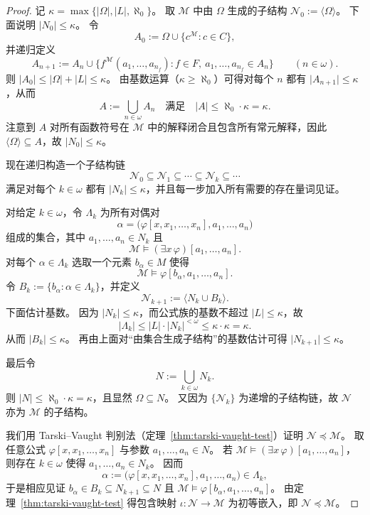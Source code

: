 \documentclass[lang=cn,a4paper,newtx,section]{elegantbook}
\begin{document}
 \begin{proof}
 记 $\kappa=\max\{\lvert\Omega\rvert,\lvert L\rvert,\aleph_0\}$。
 取 $\mathcal M$ 中由 $\Omega$ 生成的子结构 $\mathcal N_0:=\langle\Omega\rangle$。
 下面说明 $\lvert N_0\rvert\le\kappa$。
 令
 \[
   A_0:=\Omega\cup\{c^{\mathcal M}:c\in C\},
 \]
 并递归定义
 \[
   A_{n+1}:=A_n\cup\{f^{\mathcal M}(a_1,\dots,a_{n_f}):f\in F,\ a_1,\dots,a_{n_f}\in A_n\}\qquad(n\in\omega).
 \]
 则 $\lvert A_0\rvert\le\lvert\Omega\rvert+\lvert L\rvert\le\kappa$。
 由基数运算（$\kappa\ge\aleph_0$）可得对每个 $n$ 都有 $\lvert A_{n+1}\rvert\le\kappa$，从而
 \[
   A:=\bigcup_{n\in\omega}A_n\quad\text{满足}\quad \lvert A\rvert\le\aleph_0\cdot\kappa=\kappa.
 \]
 注意到 $A$ 对所有函数符号在 $\mathcal M$ 中的解释闭合且包含所有常元解释，因此 $\langle\Omega\rangle\subseteq A$，故 $\lvert N_0\rvert\le\kappa$。

 现在递归构造一个子结构链
 \[
   \mathcal N_0\subseteq\mathcal N_1\subseteq\cdots\subseteq\mathcal N_k\subseteq\cdots
 \]
 满足对每个 $k\in\omega$ 都有 $\lvert N_k\rvert\le\kappa$，并且每一步加入所有需要的存在量词见证。

 对给定 $k\in\omega$，令 $\Lambda_k$ 为所有对偶对
 \[
   \alpha=\bigl(\varphi[x,x_1,\dots,x_n],a_1,\dots,a_n\bigr)
 \]
 组成的集合，其中 $a_1,\dots,a_n\in N_k$ 且
 \[
   \mathcal M\models(\exists x\,\varphi)[a_1,\dots,a_n].
 \]
 对每个 $\alpha\in\Lambda_k$ 选取一个元素 $b_{\alpha}\in M$ 使得
 \[
   \mathcal M\models\varphi[b_{\alpha},a_1,\dots,a_n].
 \]
 令 $B_k:=\{b_{\alpha}:\alpha\in\Lambda_k\}$，并定义
 \[
   \mathcal N_{k+1}:=\langle N_k\cup B_k\rangle.
 \]
 下面估计基数。
 因为 $\lvert N_k\rvert\le\kappa$，而公式族的基数不超过 $\lvert L\rvert\le\kappa$，故
 \[
   \lvert\Lambda_k\rvert\le \lvert L\rvert\cdot\lvert N_k\rvert^{<\omega}\le\kappa\cdot\kappa=\kappa.
 \]
 从而 $\lvert B_k\rvert\le\kappa$。
 再由上面对“由集合生成子结构”的基数估计可得 $\lvert N_{k+1}\rvert\le\kappa$。

 最后令
 \[
   N:=\bigcup_{k\in\omega}N_k.
 \]
 则 $\lvert N\rvert\le\aleph_0\cdot\kappa=\kappa$，且显然 $\Omega\subseteq N$。
 又因为 $\{\mathcal N_k\}$ 为递增的子结构链，故 $\mathcal N$ 亦为 $\mathcal M$ 的子结构。

 我们用 Tarski--Vaught 判别法（定理~\ref{thm:tarski-vaught-test}）证明 $\mathcal N\preccurlyeq\mathcal M$。
 取任意公式 $\varphi[x,x_1,\dots,x_n]$ 与参数 $a_1,\dots,a_n\in N$。
 若 $\mathcal M\models(\exists x\,\varphi)[a_1,\dots,a_n]$，则存在 $k\in\omega$ 使得 $a_1,\dots,a_n\in N_k$。
 因而
 \[
   \alpha:=\bigl(\varphi[x,x_1,\dots,x_n],a_1,\dots,a_n\bigr)\in\Lambda_k,
 \]
 于是相应见证 $b_{\alpha}\in B_k\subseteq N_{k+1}\subseteq N$ 且 $\mathcal M\models\varphi[b_{\alpha},a_1,\dots,a_n]$。
 由定理~\ref{thm:tarski-vaught-test} 得包含映射 $\iota:\mathcal N\to\mathcal M$ 为初等嵌入，即 $\mathcal N\preccurlyeq\mathcal M$。
 \end{proof}
\end{document}

